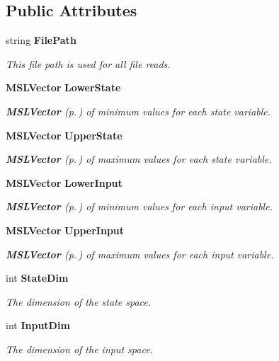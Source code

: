 \subsection*{Public Attributes}
\begin{CompactItemize}
\item 
string {\bf File\-Path}
\begin{CompactList}\small\item\em This file path is used for all file reads.\item\end{CompactList}\item 
{\bf MSLVector} {\bf Lower\-State}
\begin{CompactList}\small\item\em {\bf MSLVector} {\rm (p.\,\pageref{class_MSLVector})} of minimum values for each state variable.\item\end{CompactList}\item 
{\bf MSLVector} {\bf Upper\-State}
\begin{CompactList}\small\item\em {\bf MSLVector} {\rm (p.\,\pageref{class_MSLVector})} of maximum values for each state variable.\item\end{CompactList}\item 
{\bf MSLVector} {\bf Lower\-Input}
\begin{CompactList}\small\item\em {\bf MSLVector} {\rm (p.\,\pageref{class_MSLVector})} of minimum values for each input variable.\item\end{CompactList}\item 
{\bf MSLVector} {\bf Upper\-Input}
\begin{CompactList}\small\item\em {\bf MSLVector} {\rm (p.\,\pageref{class_MSLVector})} of maximum values for each input variable.\item\end{CompactList}\item 
int {\bf State\-Dim}
\begin{CompactList}\small\item\em The dimension of the state space.\item\end{CompactList}\item 
int {\bf Input\-Dim}
\begin{CompactList}\small\item\em The dimension of the input space.\item\end{CompactList}\end{CompactItemize}
